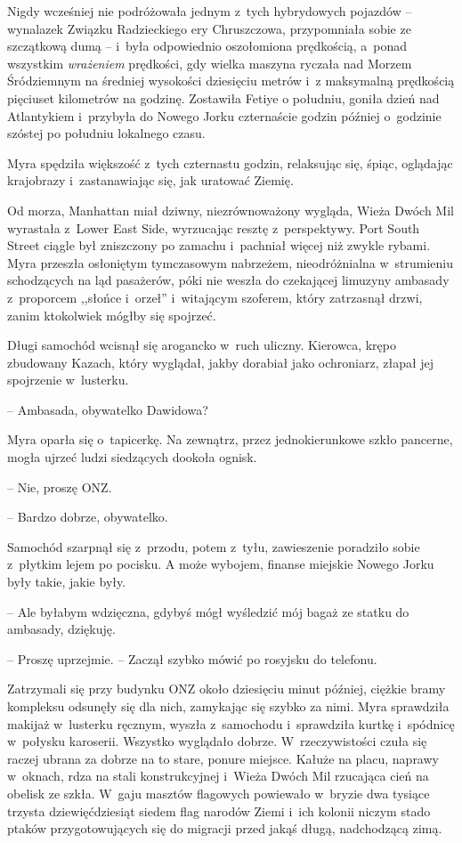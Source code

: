 \documentclass[oneside,polish,11pt,sfheadings]{mwbk}
\begin{document}
Nigdy wcześniej nie podróżowała jednym z~tych hybrydowych pojazdów -- wynalazek Związku Radzieckiego ery Chruszczowa, przypomniała sobie ze
szczątkową dumą -- i~była odpowiednio oszołomiona prędkością, a~ponad
wszystkim \textit{wrażeniem} prędkości, gdy wielka maszyna ryczała nad
Morzem Śródziemnym na średniej wysokości dziesięciu metrów i~z maksymalną prędkością pięciuset kilometrów na godzinę. Zostawiła Fetiye
o południu, goniła dzień nad Atlantykiem i~przybyła do Nowego Jorku
czternaście godzin później o~godzinie szóstej po południu lokalnego
czasu.

Myra spędziła większość z~tych czternastu godzin, relaksując się, śpiąc,
oglądając krajobrazy i~zastanawiając się, jak uratować Ziemię.

Od morza, Manhattan miał dziwny, niezrównoważony wygląda, Wieża Dwóch
Mil wyrastała z~Lower East Side, wyrzucając resztę z~perspektywy. Port
South Street ciągle był zniszczony po zamachu i~pachniał więcej niż
zwykle rybami. Myra przeszła osłoniętym tymczasowym nabrzeżem,
nieodróżnialna w~strumieniu schodzących na ląd pasażerów, póki nie
weszła do czekającej limuzyny ambasady z~proporcem ,,słońce i~orzeł'' i~witającym szoferem, który zatrzasnął drzwi, zanim ktokolwiek mógłby się
spojrzeć.

Długi samochód wcisnął się arogancko w~ruch uliczny. Kierowca, krępo
zbudowany Kazach, który wyglądał, jakby dorabiał jako ochroniarz, złapał
jej spojrzenie w~lusterku.

-- Ambasada, obywatelko Dawidowa?

Myra oparła się o~tapicerkę. Na zewnątrz, przez jednokierunkowe szkło
pancerne, mogła ujrzeć ludzi siedzących dookoła ognisk. 

-- Nie, proszę ONZ.

-- Bardzo dobrze, obywatelko.

Samochód szarpnął się z~przodu, potem z~tyłu, zawieszenie poradziło
sobie z~płytkim lejem po pocisku. A może wybojem, finanse miejskie
Nowego Jorku były takie, jakie były.

-- Ale byłabym wdzięczna, gdybyś mógł wyśledzić mój bagaż ze statku do
ambasady, dziękuję.

-- Proszę uprzejmie. -- Zaczął szybko mówić po rosyjsku do telefonu.

Zatrzymali się przy budynku ONZ około dziesięciu minut później, ciężkie
bramy kompleksu odsunęły się dla nich, zamykając się szybko za nimi.
Myra sprawdziła makijaż w~lusterku ręcznym, wyszła z~samochodu i~sprawdziła kurtkę i~spódnicę w~połysku karoserii. Wszystko wyglądało
dobrze. W~rzeczywistości czuła się raczej ubrana za dobrze na to stare,
ponure miejsce. Kałuże na placu, naprawy w~oknach, rdza na stali
konstrukcyjnej i~Wieża Dwóch Mil rzucająca cień na obelisk ze szkła. W~gaju masztów flagowych powiewało w~bryzie dwa tysiące trzysta
dziewięćdziesiąt siedem flag narodów Ziemi i~ich kolonii niczym stado
ptaków przygotowujących się do migracji przed jakąś długą, nadchodzącą
zimą.
\end{document}
